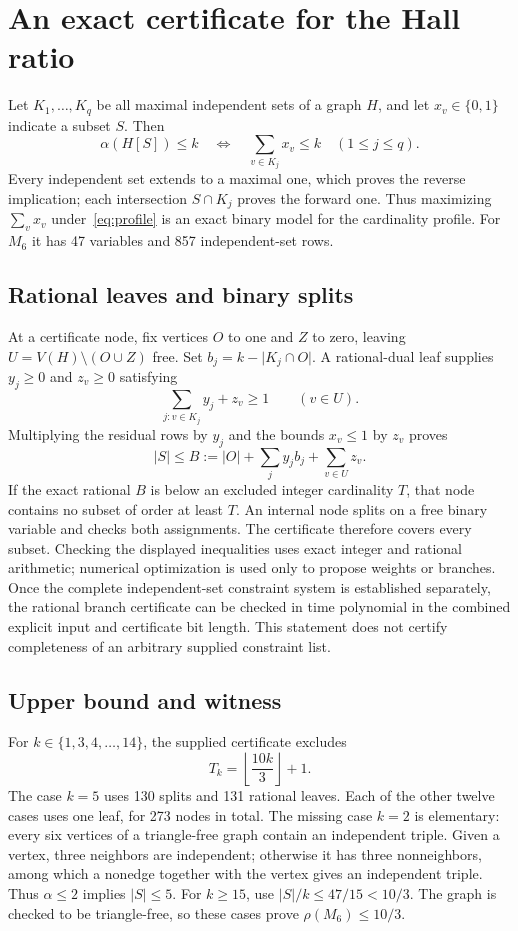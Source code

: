 \documentclass[11pt,letterpaper]{article}
\theoremstyle{remark}
\newcommand{\abs}[1]{\lvert #1\rvert}
\begin{document}
\section{An exact certificate for the Hall ratio}
Let $K_1,\ldots,K_q$ be all maximal independent sets of a graph $H$, and
let $x_v\in\{0,1\}$ indicate a subset $S$. Then
\begin{equation}\label{eq:profile}
 \alpha(H[S])\le k
 \quad\Longleftrightarrow\quad
 \sum_{v\in K_j}x_v\le k\quad(1\le j\le q).
\end{equation}
Every independent set extends to a maximal one, which proves the reverse
implication; each intersection $S\cap K_j$ proves the forward one.
Thus maximizing $\sum_vx_v$ under~\eqref{eq:profile} is an exact binary
model for the cardinality profile. For $M_6$ it has 47 variables and
857 independent-set rows.

\subsection{Rational leaves and binary splits}
At a certificate node, fix vertices $O$ to one and $Z$ to zero, leaving
$U=V(H)\setminus(O\cup Z)$ free. Set $b_j=k-\abs{K_j\cap O}$.
A rational-dual leaf supplies $y_j\ge0$ and $z_v\ge0$ satisfying
\begin{equation}\label{eq:coverage}
 \sum_{j:v\in K_j}y_j+z_v\ge1\qquad(v\in U).
\end{equation}
Multiplying the residual rows by $y_j$ and the bounds $x_v\le1$ by $z_v$
proves
\begin{equation}\label{eq:dual}
 \abs S\le B:=\abs O+\sum_j y_jb_j+\sum_{v\in U}z_v.
\end{equation}
If the exact rational $B$ is below an excluded integer cardinality $T$,
that node contains no subset of order at least $T$. An internal node
splits on a free binary variable and checks both assignments. The
certificate therefore covers every subset. Checking the displayed
inequalities uses exact integer and rational arithmetic; numerical
optimization is used only to propose weights or branches. Once the
complete independent-set constraint system is established separately,
the rational branch certificate can be checked in time polynomial in the
combined explicit input and certificate bit length. This statement does
not certify completeness of an arbitrary supplied constraint list.

\subsection{Upper bound and witness}
For $k\in\{1,3,4,\ldots,14\}$, the supplied certificate excludes
\[
 T_k=\left\lfloor\frac{10k}{3}\right\rfloor+1.
\]
The case $k=5$ uses 130 splits and 131 rational leaves. Each of the other
twelve cases uses one leaf, for 273 nodes in total. The missing case
$k=2$ is elementary: every six vertices of a triangle-free graph contain
an independent triple. Given a vertex, three neighbors are independent;
otherwise it has three nonneighbors, among which a nonedge together
with the vertex gives an independent triple. Thus $\alpha\le2$ implies
$\abs S\le5$. For $k\ge15$, use $\abs S/k\le47/15<10/3$.
The graph is checked to be triangle-free, so these cases prove
$\rho(M_6)\le10/3$.
\end{document}
